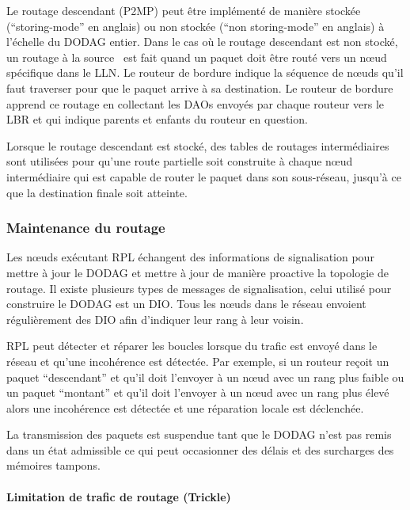 Le routage descendant (\ac{P2MP}) peut être implémenté de manière stockée (``storing-mode'' en anglais) ou non stockée (``non storing-mode'' en anglais) à l'échelle du \ac{DODAG} entier.
Dans le cas où le routage descendant est non stocké, un routage à la source~\cite{rfc6554} est fait quand un paquet doit être routé vers un nœud spécifique dans le \ac{LLN}.
Le routeur de bordure indique la séquence de nœuds qu'il faut traverser pour que le paquet arrive à sa destination.
Le routeur de bordure apprend ce routage en collectant les \ac{DAO}s envoyés par chaque routeur vers le \ac{LBR} et qui indique parents et enfants du routeur en question.

Lorsque le routage descendant est stocké, des tables de routages intermédiaires sont utilisées pour qu'une route partielle soit construite à chaque nœud intermédiaire qui est capable de router le paquet dans son sous-réseau, jusqu'à ce que la destination finale soit atteinte.

\subsubsection{Maintenance du routage}

Les nœuds exécutant \ac{RPL} échangent des informations de signalisation pour mettre à jour le \ac{DODAG} et mettre à jour de manière proactive la topologie de routage.
Il existe plusieurs types de messages de signalisation, celui utilisé pour construire le \ac{DODAG} est un \ac{DIO}.
Tous les nœuds dans le réseau envoient régulièrement des \ac{DIO} afin d'indiquer leur rang à leur voisin.

\ac{RPL} peut détecter et réparer les boucles lorsque du trafic est envoyé dans le réseau et qu'une incohérence est détectée.
Par exemple, si un routeur reçoit un paquet ``descendant'' et qu'il doit l'envoyer à un nœud avec un rang plus faible ou un paquet ``montant'' et qu'il doit l'envoyer à un nœud avec un rang plus élevé alors une incohérence est détectée et une réparation locale est déclenchée.

La transmission des paquets est suspendue tant que le \ac{DODAG} n'est pas remis dans un état admissible ce qui peut occasionner des délais et des surcharges des mémoires tampons.

\paragraph{Limitation de trafic de routage (Trickle)}

